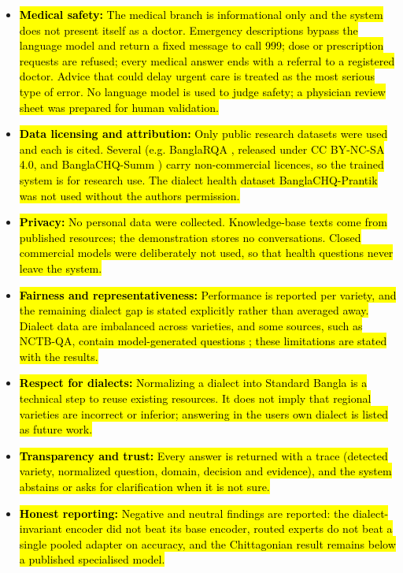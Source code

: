 \begin{itemize}
\item \hl{\textbf{Medical safety:} The medical branch is informational only
and the system does not present itself as a doctor. Emergency
descriptions bypass the language model and return a fixed message to
call 999; dose or prescription requests are refused; every medical
answer ends with a referral to a registered doctor. Advice that could
delay urgent care is treated as the most serious type of error. No
language model is used to judge safety; a physician review sheet was
prepared for human validation.}

\item \hl{\textbf{Data licensing and attribution:} Only public research
datasets were used and each is cited. Several (e.g. BanglaRQA \cite{ekram2022banglarqa},
released under CC BY-NC-SA 4.0, and BanglaCHQ-Summ \cite{khan2023banglachqsumm}) carry
non-commercial licences, so the trained system is for research use. The
dialect health dataset BanglaCHQ-Prantik \cite{prantik2025} was not used without
the authors\textquotesingle{} permission.}

\item \hl{\textbf{Privacy:} No personal data were collected. Knowledge-base
texts come from published resources; the demonstration stores no
conversations. Closed commercial models were deliberately not used, so
that health questions never leave the system.}

\item \hl{\textbf{Fairness and representativeness:} Performance is reported
per variety, and the remaining dialect gap is stated explicitly rather
than averaged away. Dialect data are imbalanced across varieties, and
some sources, such as NCTB-QA, contain model-generated questions
\cite{nctbqa}; these limitations are stated with the results.}

\item \hl{\textbf{Respect for dialects:} Normalizing a dialect into Standard
Bangla is a technical step to reuse existing resources. It does not
imply that regional varieties are incorrect or inferior; answering in
the user\textquotesingle s own dialect is listed as future work.}

\item \hl{\textbf{Transparency and trust:} Every answer is returned with a
trace (detected variety, normalized question, domain, decision and
evidence), and the system abstains or asks for clarification when it is
not sure.}

\item \hl{\textbf{Honest reporting:} Negative and neutral findings are
reported: the dialect-invariant encoder did not beat its base encoder,
routed experts do not beat a single pooled adapter on accuracy, and the
Chittagonian result remains below a published specialised model.}
\end{itemize}

